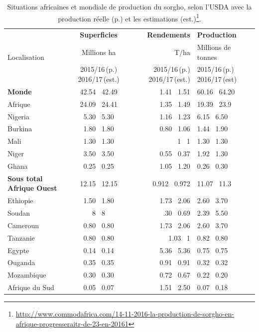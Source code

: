 \documentclass[a4paper,11pt]{article}
\begin{document}
 
\begin{table}
  \begin{footnotesize}
  \begin{center}
    \begin{tabular}{|l|c|r|p{4cm}|}
      \hline
  \multirow{3}{*}{Localisation} & \textbf{Superficies}      & \textbf{Rendements}  & \textbf{Production}          \\ \cline{2-3} \cline{3-4} \cline{4-4}
  & Millions ha      &  T/ha      & Millions de tonnes   \\ 
     & 2015/16\,(p.) 2016/17\,(est.) & 2015/16\,(p.)  2016/17\,(est.) & 2015/16\,(p.) 2016/17\,(est)        \\ \hline
     \multirow{1}{*}{\textbf{Monde}} & 42.54  \, 42.49 & 1.41  \, 1.51 & 60.16 \, 64.20 \\ \hline
     \multirow{1}{*}{Afrique} & 24.09 \, 24.41 & 1.35 \, 1.49 & 19.39 \, 23.9 \\ \hline
      \multirow{1}{*}{Nigeria} & 5.30  \, 5.30 & 1.16  \, 1.23 & 6.15 \, 6.50 \\ \hline
      \multirow{1}{*}{Burkina} & 1.80  \, 1.80 & 0.80  \, 1.06 & 1.44 \, 1.90 \\ \hline
      \multirow{1}{*}{Mali} & 1.30  \, 1.30 & 1  \, 1  & 1.30  \, 1.30  \\ \hline
      \multirow{1}{*}{Niger} & 3.50  \, 3.50 & 0.55  \, 0.37  & 1.92  \, 1.30  \\ \hline
      \multirow{1}{*}{Ghana} & 0.25  \, 0.25 & 1.05  \, 1.20  & 0.26  \, 0.30  \\ \hline
      \multirow{1}{*}{\textbf{Sous total Afrique Ouest}} & 12.15  \, 12.15 & 0.912 \, 0.972  & 11.07  \, 11.3  \\ \hline
      \multirow{1}{*}{Ethiopie} & 1.50  \, 1.80 & 1.73  \, 2.06  & 2.60  \, 3.70  \\ \hline
      \multirow{1}{*}{Soudan} & 8  \, 8 & .30  \, 0.69  & 2.39  \, 5.50  \\ \hline
      \multirow{1}{*}{Cameroun} & 0.80  \, 0.80 & 1.73  \, 2.06  & 2.60  \, 3.70  \\ \hline
      \multirow{1}{*}{Tanzanie} & 0.80  \, 0.80 & 1.03  \, 1  & 0.82  \, 0.80  \\ \hline
      \multirow{1}{*}{Egypte} & 0.14  \, 0.14 & 5.36  \, 5.36  & 0.75  \, 0.75  \\ \hline
      \multirow{1}{*}{Ouganda} & 0.35  \, 0.35 & 0.91  \, 0.91  & 0.32  \, 0.32  \\ \hline
      \multirow{1}{*}{Mozambique} & 0.30  \, 0.30 & 0.72  \, 0.67  & 0.22  \, 0.20  \\ \hline
      \multirow{1}{*}{Afrique du Sud} & 0.05  \, 0.07 & 1.51  \, 2.50  & 0.07  \, 0.18  \\ \hline
    \end{tabular}
    \caption{Situations africaines et mondiale de production du sorgho, selon l'USDA avec la production réelle (p.) et les estimations (est.)\protect\footnote{\protect\url{http://www.commodafrica.com/14-11-2016-la-production-de-sorgho-en-afrique-progresseraitr-de-23-en-20161}}.}
  \end{center}
  \end{footnotesize}
\end{table}
\end{document}
